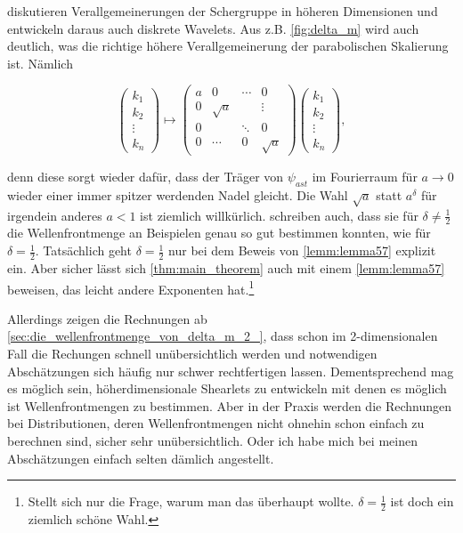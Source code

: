 \textcite{Guo2006} diskutieren Verallgemeinerungen der Schergruppe in höheren Dimensionen und entwickeln daraus auch diskrete Wavelets. Aus z.B. \cref{fig:delta_m} wird auch deutlich, was die richtige höhere Verallgemeinerung der parabolischen Skalierung ist. Nämlich

\begin{equation*}
\begin{pmatrix}
k_1 \\ k_2 \\ \vdots \\ k_n
\end{pmatrix}
\mapsto
\begin{pmatrix}
	a & 0 		& \cdots & 0\\
	0 & \sqrt a & 		 & 	\vdots\\
	0 & 			& \ddots & 0 \\
	0 & \cdots  & 	0    & \sqrt{a}
\end{pmatrix}
\begin{pmatrix}
k_1 \\ k_2 \\ \vdots \\ k_n
\end{pmatrix},
\end{equation*}

denn diese sorgt wieder dafür, dass der Träger von $\psi_{ast}$ im Fourierraum für $a \to 0$ wieder einer immer spitzer werdenden Nadel gleicht. Die Wahl $\sqrt{a}$ statt $a^\delta$ für irgendein anderes $a<1$ ist ziemlich willkürlich. \textcite{Kutyniok2008} schreiben auch, dass sie für $\delta \neq \frac{1}{2}$ die Wellenfrontmenge an Beispielen genau so gut bestimmen konnten, wie für $\delta = \frac{1}{2}$. Tatsächlich geht $\delta = \frac{1}{2}$ nur bei dem Beweis von \cref{lemm:lemma57} explizit ein. Aber sicher lässt sich \cref{thm:main_theorem} auch mit einem \cref{lemm:lemma57} beweisen, das leicht andere Exponenten hat.\footnote{Stellt sich nur die Frage, warum man das überhaupt wollte. $\delta = \frac{1}{2}$ ist doch ein ziemlich schöne Wahl.}

Allerdings zeigen die Rechnungen ab \cref{sec:die_wellenfrontmenge_von_delta_m_2_}, dass schon im 2-dimensionalen Fall die Rechungen schnell unübersichtlich werden und notwendigen Abschätzungen sich häufig nur schwer rechtfertigen lassen. Dementsprechend mag es möglich sein, höherdimensionale Shearlets zu entwickeln mit denen es möglich ist Wellenfrontmengen zu bestimmen. Aber in der Praxis werden die Rechnungen bei Distributionen, deren Wellenfrontmengen nicht ohnehin schon einfach zu berechnen sind, sicher sehr unübersichtlich. Oder ich habe mich bei meinen Abschätzungen einfach selten dämlich angestellt.



